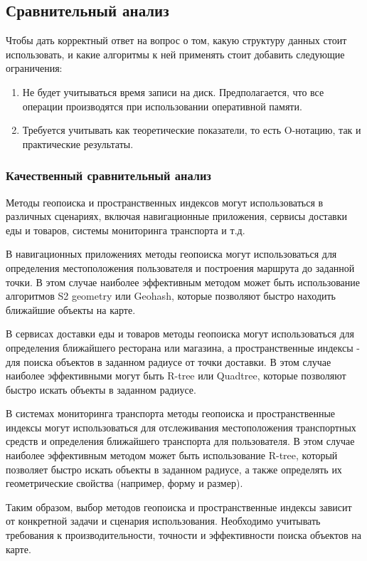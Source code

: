 \subsection{Сравнительный анализ}
Чтобы дать корректный ответ на вопрос о том, какую структуру данных стоит использовать, и какие алгоритмы к ней применять стоит добавить следующие ограничения:
\begin{enumerate}
    \item Не будет учитываться время записи на диск. Предполагается, что все операции производятся при использовании оперативной памяти.
    \item Требуется учитывать как теоретические показатели, то есть O-нотацию, так и практические результаты.
\end{enumerate}

\subsubsection{Качественный сравнительный анализ}
Методы геопоиска и пространственных индексов могут использоваться в различных сценариях, включая навигационные приложения, сервисы доставки еды и товаров, системы мониторинга транспорта и т.д. 

В навигационных приложениях методы геопоиска могут использоваться для определения местоположения пользователя и построения маршрута до заданной точки. В этом случае наиболее эффективным методом может быть использование алгоритмов S2 geometry или Geohash, которые позволяют быстро находить ближайшие объекты на карте. 

В сервисах доставки еды и товаров методы геопоиска могут использоваться для определения ближайшего ресторана или магазина, а пространственные индексы - для поиска объектов в заданном радиусе от точки доставки. В этом случае наиболее эффективными могут быть R-tree или Quadtree, которые позволяют быстро искать объекты в заданном радиусе. 

В системах мониторинга транспорта методы геопоиска и пространственные индексы могут использоваться для отслеживания местоположения транспортных средств и определения ближайшего транспорта для пользователя. В этом случае наиболее эффективным методом может быть использование R-tree, который позволяет быстро искать объекты в заданном радиусе, а также определять их геометрические свойства (например, форму и размер). 

Таким образом, выбор методов геопоиска и пространственные индексы зависит от конкретной задачи и сценария использования. Необходимо учитывать требования к производительности, точности и эффективности поиска объектов на карте. 


